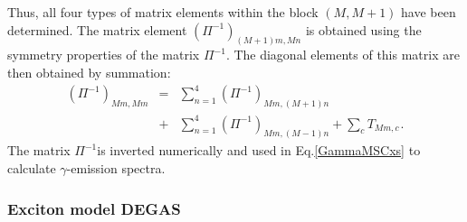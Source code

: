 \documentclass[twocolumn,amsmath,amssymb,10pt,groupedaddress,a4paper]{revtex4}
\begin{document}
Thus, all four types of matrix elements within the block $(M,M+1)$
have been determined. The matrix element $(\Pi^{-1})_{(M+1)m,Mn}$
is obtained using the symmetry properties of the matrix $\Pi^{-1}$.
The diagonal elements of this matrix are then obtained by summation:
\begin{eqnarray}
(\Pi^{-1})_{Mm,Mm} &=& \sum_{n=1}^{4}(\Pi^{-1})_{Mm,(M+1)n}  \\
&+& \sum_{n=1}^{4}(\Pi^{-1})_{Mm,(M-1)n} + \sum_{c}T_{Mm,c} \hspace{1pt}.\nonumber
\end{eqnarray}
The matrix $\Pi^{-1}$is inverted numerically and used in Eq.\ref{GammaMSCxs}
to calculate $\gamma$-emission spectra.



\subsubsection{Exciton model DEGAS\label{DEGAS}}
\end{document}
